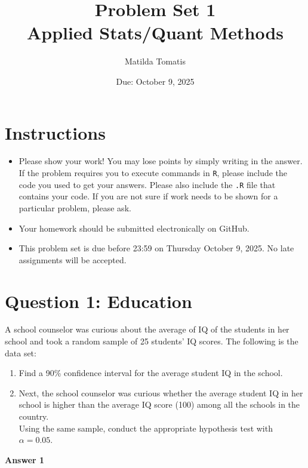 \documentclass[12pt,letterpaper]{article}
\title{Problem Set 1 \\
\large Applied Stats/Quant Methods }
\date{Due: October 9, 2025}
\author{Matilda Tomatis}
\begin{document}
	\maketitle
	
	\section*{Instructions}
	\begin{itemize}
	\item Please show your work! You may lose points by simply writing in the answer. If the problem requires you to execute commands in \texttt{R}, please include the code you used to get your answers. Please also include the \texttt{.R} file that contains your code. If you are not sure if work needs to be shown for a particular problem, please ask.
\item Your homework should be submitted electronically on GitHub.
\item This problem set is due before 23:59 on Thursday October 9, 2025. No late assignments will be accepted.
	\end{itemize}
	
	\vspace{1cm}
	\section*{Question 1: Education}

A school counselor was curious about the average of IQ of the students in her school and took a random sample of 25 students' IQ scores. The following is the data set:\\
\vspace{.5cm}

  

\vspace{1cm}

\begin{enumerate}
	\item Find a 90\% confidence interval for the average student IQ in the school.\\
	
	\item Next, the school counselor was curious  whether  the average student IQ in her school is higher than the average IQ score (100) among all the schools in the country.\\ 
	
	\noindent Using the same sample, conduct the appropriate hypothesis test with $\alpha=0.05$.
\end{enumerate}
\vspace{1cm}
\textbf{Answer 1}
\end{document}
